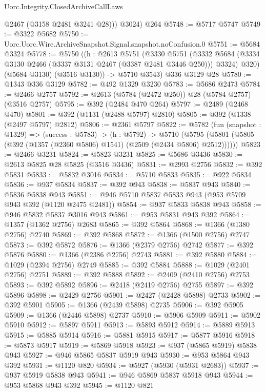\begin{lexlean}{Uorc.Integrity.ClosedArchiveCallLaws}
\begin{coremodule}
          @2467
          (@3158 @2481 @3241 @28)))
      @3024)
    @264
@5748 := @5717 @5747
@5749 := @3322 @5682
@5750 := Uorc.Uorc.Wire.ArchiveSnapshot.Signal.snapshot.noConfusion.{0}
@5751 := @5684 @3324
@5778 := @5750
    ((h : @2613
      @5751
      (@3330
        @5751
        (@3332 @5684 (@3334 @3130 @2466 (@3337 @3131 @2467 (@3387 @2481 @3446 @250))) @3324)
        @320)
      (@5684 @3130)
      (@3516 @3130)) ->
    @5710 @3543)
    @336
    @3129
    @28
@5780 := @1343 @336 @3129
@5782 := @492 @1329 @3230
@5783 := @5686 @2473
@5784 := @2466 @2757
@5792 := @2613 (@5784 (@2472 @250)) @28 (@5784 @2757) (@3516 @2757)
@5795 := @392 (@2484 @470 @264)
@5797 := @2489 (@2468 @470)
@5801 := @392 (@1131 (@2488 @5797) @2810)
@5805 := @392 (@1338 (@2497 @5797) @2812)
@5806 := @2361 @5797
@5822 := @5782
    (fun (snapshot : @1329) =>
    (success : @5783) ->
    (h : @5792) ->
    @5710 (@5795 (@5801 (@5805 (@392 (@1357 (@2360 @5806) @1541) (@2509 (@2434 @5806) @2512))))))
@5823 := @2466 @3231
@5824 := @5823 @3231
@5825 := @5686 @3436
@5830 := @2613 @5825 @28 @5825 (@3516 @3436)
@5831 := @2993 @2756
@5832 := @392 @5831
@5833 := @5832 @3016
@5834 := @5710 @5833
@5835 := @922 @5834
@5836 := @937 @5834
@5837 := @392 @943
@5838 := @5837 @943
@5840 := @5836 @5838 @943
@5851 := @946 @5710 @5837 @5833 @943 (@953 @5709 @943 @392 (@1120 @2475 @2481))
@5854 := @937 @5833 @5838 @943
@5858 := @946 @5832 @5837 @3016 @943
@5861 := @953 @5831 @943 @392
@5864 := @1357 (@1362 @2756) @2683
@5865 := @392 @5864
@5868 := @1366 (@1380 @2756) @2740
@5869 := @392 @5868
@5872 := @1366 (@1500 @2756) @2747
@5873 := @392 @5872
@5876 := @1366 (@2379 @2756) @2742
@5877 := @392 @5876
@5880 := @1366 (@2386 @2756) @2743
@5881 := @392 @5880
@5884 := @1029 (@2394 @2756) @2749
@5885 := @392 @5884
@5888 := @1029 (@2401 @2756) @2751
@5889 := @392 @5888
@5892 := @2409 (@2410 @2756) @2753
@5893 := @392 @5892
@5896 := @2418 (@2419 @2756) @2755
@5897 := @392 @5896
@5898 := @2429 @2756
@5901 := @2427 (@2428 @5898) @2733
@5902 := @392 @5901
@5905 := @1366 (@2439 @5898) @2735
@5906 := @392 @5905
@5909 := @1366 (@2446 @5898) @2737
@5910 := @5906 @5909
@5911 := @5902 @5910
@5912 := @5897 @5911
@5913 := @5893 @5912
@5914 := @5889 @5913
@5915 := @5885 @5914
@5916 := @5881 @5915
@5917 := @5877 @5916
@5918 := @5873 @5917
@5919 := @5869 @5918
@5923 := @937 (@5865 @5919) @5838 @943
@5927 := @946 @5865 @5837 @5919 @943
@5930 := @953 @5864 @943 @392
@5931 := @1120 @820
@5934 := @5927 (@5930 (@5931 @2683))
@5937 := @937 @5919 @5838 @943
@5941 := @946 @5869 @5837 @5918 @943
@5944 := @953 @5868 @943 @392
@5945 := @1120 @821

\end{coremodule}
\end{lexlean}
